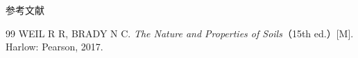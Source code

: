 \documentclass[aspectratio=169,10pt,fontset=fandol]{ctexbeamer}
\begin{document}
\begin{frame}[t,fragile]{参考文献}
\normalsize
{\normalsize
\begin{thebibliography}{99}
 WEIL R R, BRADY N C. \emph{The Nature and Properties of Soils}（15th ed.）[M]. Harlow: Pearson, 2017.
\end{thebibliography}
}
\end{frame}
\end{document}
